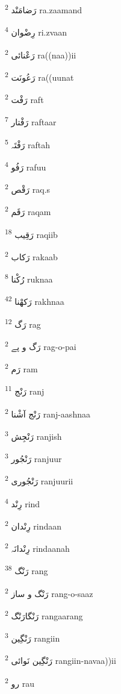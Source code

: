 \documentclass[12pt]{article}
\begin{document}
\begin{RTL}
\begin{multicols}{5}
{\ur رَضامَنْد}   \textsuperscript{2} ra.zaamand

{\ur رِضْوان}   \textsuperscript{4} ri.zvaan

{\ur رَعْنائی}   \textsuperscript{2} ra((naa))ii

{\ur رَعُونَت}   \textsuperscript{2} ra((uunat

{\ur رَفْت}   \textsuperscript{2} raft

{\ur رَفْتار}   \textsuperscript{7} raftaar

{\ur رَفْتَہ}   \textsuperscript{5} raftah

{\ur رَفُو}   \textsuperscript{4} rafuu

{\ur رَقْص}   \textsuperscript{2} raq.s

{\ur رَقَم}   \textsuperscript{2} raqam

{\ur رَقِیب}   \textsuperscript{18} raqiib

{\ur رَکاب}   \textsuperscript{2} rakaab

{\ur رُکْنا}   \textsuperscript{8} ruknaa

{\ur رَکھْنا}   \textsuperscript{42} rakhnaa

{\ur رَگ}   \textsuperscript{12} rag

{\ur رَگ و پے}   \textsuperscript{2} rag-o-pai

{\ur رَم}   \textsuperscript{2} ram

{\ur رَنْج}   \textsuperscript{11} ranj

{\ur رَنْج آشْنا}   \textsuperscript{2} ranj-aashnaa

{\ur رَنْجِش}   \textsuperscript{3} ranjish

{\ur رَنْجُور}   \textsuperscript{3} ranjuur

{\ur رَنْجُوری}   \textsuperscript{2} ranjuurii

{\ur رِنْد}   \textsuperscript{4} rind

{\ur رِنْدان}   \textsuperscript{2} rindaan

{\ur رِنْدانَہ}   \textsuperscript{2} rindaanah

{\ur رَنْگ}   \textsuperscript{38} rang

{\ur رَنْگ و ساز}   \textsuperscript{2} rang-o-saaz

{\ur رَنْگارَنْگ}   \textsuperscript{2} rangaarang

{\ur رَنْگِین}   \textsuperscript{3} rangiin

{\ur رَنْگِین نَوائی}   \textsuperscript{2} rangiin-navaa))ii

{\ur رو}   \textsuperscript{2} rau


\end{multicols}
\end{RTL}
\end{document}
